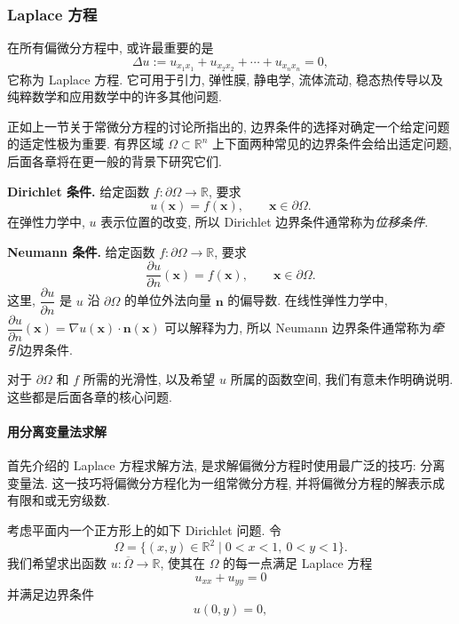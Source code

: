 \subsubsection{Laplace 方程}\label{subsec:laplace-equation}

在所有偏微分方程中, 或许最重要的是
\begin{equation}\label{eq:laplace-general}
\Delta u:=u_{x_1x_1}+u_{x_2x_2}+\cdots+u_{x_nx_n}=0,
\end{equation}
它称为 Laplace 方程. 它可用于引力, 弹性膜, 静电学, 流体流动, 稳态热传导以及纯粹数学和应用数学中的许多其他问题.

正如上一节关于常微分方程的讨论所指出的, 边界条件的选择对确定一个给定问题的适定性极为重要. 有界区域 $\Omega\subset\mathbb{R}^n$ 上下面两种常见的边界条件会给出适定问题, 后面各章将在更一般的背景下研究它们.

\textbf{Dirichlet 条件.} 给定函数 $f:\partial\Omega\to\mathbb{R}$, 要求
\begin{equation}\label{eq:dirichlet-boundary-data}
u(\bm{x})=f(\bm{x}),\qquad\bm{x}\in\partial\Omega.
\end{equation}
在弹性力学中, $u$ 表示位置的改变, 所以 Dirichlet 边界条件通常称为\emph{位移条件}.

\textbf{Neumann 条件.} 给定函数 $f:\partial\Omega\to\mathbb{R}$, 要求
\begin{equation}\label{eq:neumann-boundary-data}
\dfrac{\partial u}{\partial n}(\bm{x})=f(\bm{x}),\qquad\bm{x}\in\partial\Omega.
\end{equation}
这里, $\dfrac{\partial u}{\partial n}$ 是 $u$ 沿 $\partial\Omega$ 的单位外法向量 $\bm{n}$ 的偏导数. 在线性弹性力学中, $\dfrac{\partial u}{\partial n}(\bm{x})=\nabla u(\bm{x})\cdot\bm{n}(\bm{x})$ 可以解释为力, 所以 Neumann 边界条件通常称为\emph{牵引}边界条件.

对于 $\partial\Omega$ 和 $f$ 所需的光滑性, 以及希望 $u$ 所属的函数空间, 我们有意未作明确说明. 这些都是后面各章的核心问题.

\paragraph*{用分离变量法求解}

首先介绍的 Laplace 方程求解方法, 是求解偏微分方程时使用最广泛的技巧: 分离变量法. 这一技巧将偏微分方程化为一组常微分方程, 并将偏微分方程的解表示成有限和或无穷级数.

考虑平面内一个正方形上的如下 Dirichlet 问题. 令
\[
\Omega=\{(x,y)\in\mathbb{R}^2\mid 0<x<1,\ 0<y<1\}.
\]
我们希望求出函数 $u:\overline\Omega\to\mathbb{R}$, 使其在 $\Omega$ 的每一点满足 Laplace 方程
\begin{equation}\label{eq:laplace-planar}
u_{xx}+u_{yy}=0
\end{equation}
并满足边界条件
\begin{equation}\label{eq:square-left-boundary}
u(0,y)=0,
\end{equation}

